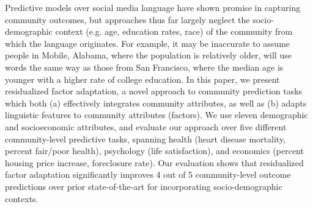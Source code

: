 Predictive models over social media language have shown promise in capturing community outcomes, but approaches thus far largely neglect the socio-demographic context (e.g. age, education rates, race) of the community from which the language originates. For example, it may be inaccurate to assume people in Mobile, Alabama, where the population is relatively older, will use words the same way as those from San Francisco, where the median age is younger with a higher rate of college education. In this paper, we present residualized factor adaptation, a novel approach to community prediction tasks which both (a) effectively integrates community attributes, as well as (b) adapts linguistic features to community attributes (factors). We use eleven demographic and socioeconomic attributes, and evaluate our approach over five different community-level predictive tasks, spanning health (heart disease mortality, percent fair/poor health), psychology (life satisfaction), and economics (percent housing price increase, foreclosure rate). Our evaluation shows that residualized factor adaptation significantly improves 4 out of 5 community-level outcome predictions over prior state-of-the-art for incorporating socio-demographic contexts.
